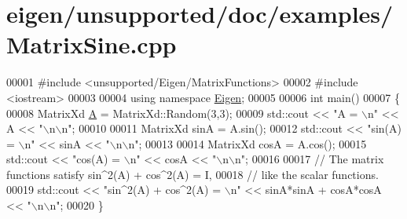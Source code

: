 \hypertarget{eigen_2unsupported_2doc_2examples_2_matrix_sine_8cpp_source}{}\section{eigen/unsupported/doc/examples/\+Matrix\+Sine.cpp}
\label{eigen_2unsupported_2doc_2examples_2_matrix_sine_8cpp_source}

\begin{DoxyCode}
00001 \textcolor{preprocessor}{#include <unsupported/Eigen/MatrixFunctions>}
00002 \textcolor{preprocessor}{#include <iostream>}
00003 
00004 \textcolor{keyword}{using namespace }\hyperlink{namespace_eigen}{Eigen};
00005 
00006 \textcolor{keywordtype}{int} main()
00007 \{
00008   MatrixXd \hyperlink{group___core___module_class_eigen_1_1_matrix}{A} = MatrixXd::Random(3,3);
00009   std::cout << \textcolor{stringliteral}{"A = \(\backslash\)n"} << A << \textcolor{stringliteral}{"\(\backslash\)n\(\backslash\)n"};
00010 
00011   MatrixXd sinA = A.sin();
00012   std::cout << \textcolor{stringliteral}{"sin(A) = \(\backslash\)n"} << sinA << \textcolor{stringliteral}{"\(\backslash\)n\(\backslash\)n"};
00013 
00014   MatrixXd cosA = A.cos();
00015   std::cout << \textcolor{stringliteral}{"cos(A) = \(\backslash\)n"} << cosA << \textcolor{stringliteral}{"\(\backslash\)n\(\backslash\)n"};
00016   
00017   \textcolor{comment}{// The matrix functions satisfy sin^2(A) + cos^2(A) = I, }
00018   \textcolor{comment}{// like the scalar functions.}
00019   std::cout << \textcolor{stringliteral}{"sin^2(A) + cos^2(A) = \(\backslash\)n"} << sinA*sinA + cosA*cosA << \textcolor{stringliteral}{"\(\backslash\)n\(\backslash\)n"};
00020 \}
\end{DoxyCode}

